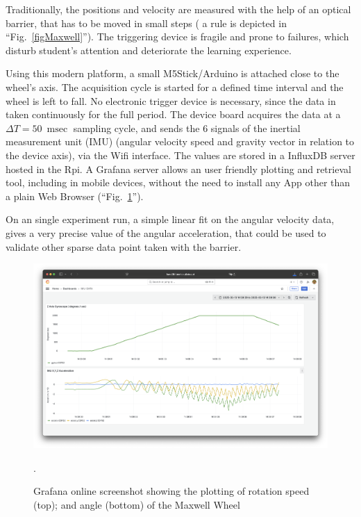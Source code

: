 \documentclass[conference]{IEEEtran}
\begin{document}
Traditionally, the positions and velocity are measured  with the help of an optical barrier, that has to be moved in small steps ( a rule is depicted in ``Fig.~\ref{figMaxwell}''). 
The triggering device is fragile and prone to failures, which disturb student's attention and deteriorate the learning experience.

Using this modern platform, a small M5Stick/Arduino is attached close to the wheel's axis.
The acquisition  cycle is started for a defined time interval and the wheel is left to fall. No electronic trigger device is necessary, since the data in taken continuously for the full period.
The device board acquires the data at a $\Delta T = \SI{50}{\milli\sec}$ sampling cycle, and sends 
 the 6 signals of the inertial measurement unit (IMU) (angular velocity speed and gravity vector in relation to the device axis), via the Wifi interface. 
 The values are stored in a InfluxDB server hosted in the Rpi. 
 A Grafana server\cite{b7} allows an user friendly plotting and retrieval tool, including in mobile devices, 
 without the need to install any App other than a plain Web Browser (``Fig.~\ref{figIMU}'').

On an single experiment run, a simple linear fit on the angular velocity data, gives a very precise value of the angular acceleration,
that could be used to validate other sparse data point taken with the barrier.


\begin{figure}[tbp]
\centerline{\includegraphics[width=\columnwidth]{IMUGrafana.png}}
\caption{Grafana online screenshot showing the plotting of rotation speed (top); and angle (bottom) of the Maxwell Wheel}.
\label{figIMU}
\end{figure}
\end{document}
